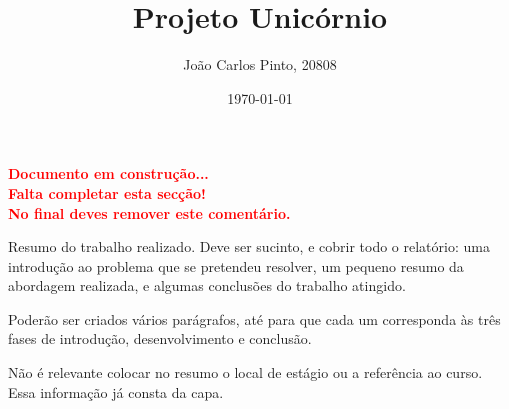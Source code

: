 \documentclass[a4paper,12pt,twoside]{book}
\title{Projeto Unicórnio}
\author{João Carlos Pinto, 20808}
\date{\today}
\begin{document}



\frontmatter
\maketitle  %

\begin{resumo}

\textbf{\textcolor{Red}{Documento em construção... \\Falta completar esta secção! \\No final deves remover este comentário.}}

Resumo do trabalho realizado. Deve ser sucinto, e cobrir todo o relatório: uma introdução ao problema que se pretendeu resolver, um pequeno resumo da abordagem realizada, e algumas conclusões do trabalho atingido.

Poderão ser criados vários parágrafos, até para que cada um corresponda às três fases de introdução, desenvolvimento e conclusão.

Não é relevante colocar no resumo o local de estágio ou a referência ao curso. Essa informação já consta da capa.
\end{resumo}



\tableofcontents

\listoffigures
{}

\listoftables
{}

\lstlistoflistings
{}

\printglossary[type=\acronymtype,title={Siglas \& Acrónimos},toctitle={Siglas \& Acrónimos}]

\printglossary[title={Indice de Termos},toctitle={Indice de Termos}]

\mainmatter






\end{document}
